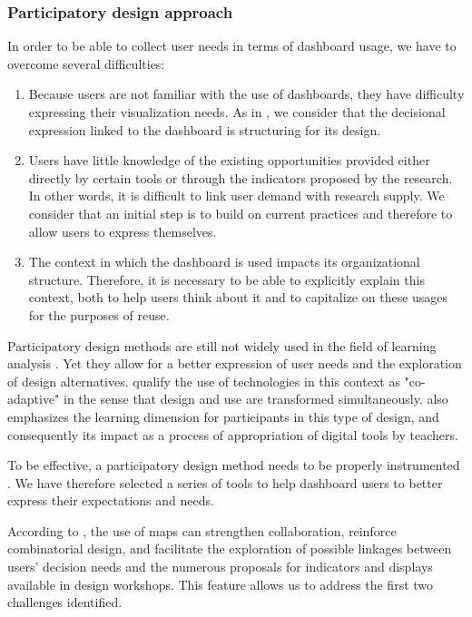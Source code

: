 \documentclass[preprint,12pt]{elsarticle}
\begin{document}
\subsubsection{Participatory design approach}
In order to be able to collect user needs in terms of dashboard usage, we have to overcome several difficulties:
\begin{enumerate}
    \item Because users are not familiar with the use of dashboards, they have difficulty expressing their visualization needs. As in \citet{xhakaj2017effects}, we consider that the decisional expression linked to the dashboard is structuring for its design.
    \item Users have little knowledge of the existing opportunities provided either directly by certain tools or through the indicators proposed by the research. In other words, it is difficult to link user demand with research supply. We consider that an initial step is to build on current practices and therefore to allow users to express themselves.
    \item The context in which the dashboard is used impacts its organizational structure. Therefore, it is necessary to be able to explicitly explain this context, both to help users think about it and to capitalize on these usages for the purposes of reuse.
\end{enumerate}

Participatory design methods are still not widely used in the field of learning analysis \cite{abel2013cross}. Yet they allow for a better expression of user needs and the exploration of design alternatives. \citet{mackay1997radicalement} qualify the use of technologies in this context as "co-adaptive" in the sense that design and use are transformed simultaneously. \citet{knibbe2016} also emphasizes the learning dimension for participants in this type of design, and consequently its impact as a process of appropriation of digital tools by teachers.

To be effective, a participatory design method needs to be properly instrumented \cite{sanders2010framework}. We have therefore selected a series of tools to help dashboard users to better express their expectations and needs.

According to \citet{lucero2016designing}, the use of maps can strengthen collaboration, reinforce combinatorial design, and facilitate the exploration of possible linkages between users' decision needs and the numerous proposals for indicators and displays available in design workshops. This feature allows us to address the first two challenges identified.
\end{document}
